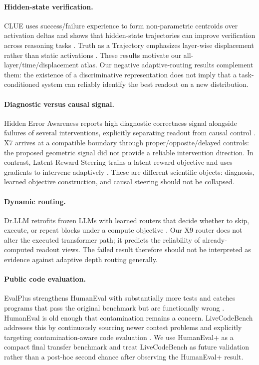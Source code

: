 \documentclass[11pt]{article}
\begin{document}
\paragraph{Hidden-state verification.}
CLUE uses success/failure experience to form non-parametric centroids over activation deltas and shows that hidden-state trajectories can improve verification across reasoning tasks \cite{liang2026clue}. Truth as a Trajectory emphasizes layer-wise displacement rather than static activations \cite{damirchi2026trajectory}. These results motivate our all-layer/time/displacement atlas. Our negative adaptive-routing results complement them: the existence of a discriminative representation does not imply that a task-conditioned system can reliably identify the best readout on a new distribution.

\paragraph{Diagnostic versus causal signal.}
Hidden Error Awareness reports high diagnostic correctness signal alongside failures of several interventions, explicitly separating readout from causal control \cite{yuan2026errorawareness}. X7 arrives at a compatible boundary through proper/opposite/delayed controls: the proposed geometric signal did not provide a reliable intervention direction. In contrast, Latent Reward Steering trains a latent reward objective and uses gradients to intervene adaptively \cite{li2026latent}. These are different scientific objects: diagnosis, learned objective construction, and causal steering should not be collapsed.

\paragraph{Dynamic routing.}
Dr.LLM retrofits frozen LLMs with learned routers that decide whether to skip, execute, or repeat blocks under a compute objective \cite{heakl2026drllm}. Our X9 router does not alter the executed transformer path; it predicts the reliability of already-computed readout views. The failed result therefore should not be interpreted as evidence against adaptive depth routing generally.

\paragraph{Public code evaluation.}
EvalPlus strengthens HumanEval with substantially more tests and catches programs that pass the original benchmark but are functionally wrong \cite{liu2023evalplus}. HumanEval is old enough that contamination remains a concern. LiveCodeBench addresses this by continuously sourcing newer contest problems and explicitly targeting contamination-aware code evaluation \cite{jain2024livecodebench}. We use HumanEval+ as a compact final transfer benchmark and treat LiveCodeBench as future validation rather than a post-hoc second chance after observing the HumanEval+ result.
\end{document}
